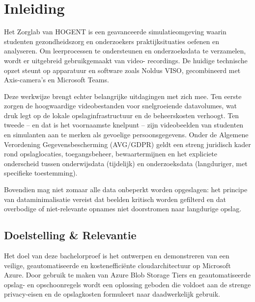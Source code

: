 


\section{Inleiding}%
\label{sec:inleiding}

Het Zorglab van HOGENT is een geavanceerde simulatieomgeving waarin studenten gezondheidszorg en onderzoekers praktijksituaties oefenen en analyseren. Om leerprocessen te ondersteunen en onderzoeksdata te verzamelen, wordt er uitgebreid gebruikgemaakt van video- recordings. De huidige technische opzet steunt op apparatuur en software zoals Noldus VISO, gecombineerd met Axis-camera’s en Microsoft Teams.

Deze werkwijze brengt echter belangrijke uitdagingen met zich mee. Ten eerste zorgen de hoogwaardige videobestanden voor snelgroeiende datavolumes, wat druk legt op de lokale opslaginfrastructuur en de beheerskosten verhoogt. Ten tweede – en dat is het voornaamste knelpunt – zijn videobeelden van studenten en simulanten aan te merken als gevoelige persoonsgegevens. Onder de Algemene Verordening Gegevensbescherming (AVG/GDPR) geldt een streng juridisch kader rond opslaglocaties, toegangsbeheer, bewaartermijnen en het expliciete onderscheid tussen onderwijsdata (tijdelijk) en onderzoeksdata (langduriger, met specifieke toestemming).

Bovendien mag niet zomaar alle data onbeperkt worden opgeslagen: het principe van dataminimalisatie vereist dat beelden kritisch worden gefilterd en dat overbodige of niet-relevante opnames niet doorstromen naar langdurige opslag.

\subsection{Doelstelling \& Relevantie}%
\label{subsec:doelstelling}

Het doel van deze bachelorproef is het ontwerpen en demonstreren van een veilige, geautomatiseerde en kostenefficiënte cloudarchitectuur op Microsoft Azure. Door gebruik te maken van Azure Blob Storage Tiers en geautomatiseerde opslag- en opschoonregels wordt een oplossing geboden die voldoet aan de strenge privacy-eisen en de opslagkosten formuleert naar daadwerkelijk gebruik.

